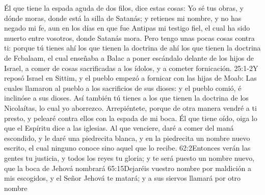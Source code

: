 Él que tiene la espada aguda de dos filos,%
 dice estas cosas:
Yo sé tus obras, y dónde moras,%
 donde está la silla de Satanás; y retienes mi nombre, y no has negado mi fe, aun en los días en que fue Antipas mi testigo fiel, el cual ha sido muerto entre vosotros, donde Satanás mora. %
Pero tengo unas pocas cosas contra ti: porque tú tienes ahí los que tienen la doctrina de ahí los que tienen la doctrina de Fcbalaam, el cual enseñaba a Balac a poner escándalo delante de los hijos de Israel, a comer de cosas sacrificadas a los ídolos, y a cometer fornicación.%
								{25:1-2}{Y reposó Israel en Sittim, y el pueblo empezó a fornicar con las hijas de Moab: Las cuales llamaron al pueblo a los sacrificios de sus dioses: y el pueblo comió, é inclinóse a sus dioses.}
Así también tú tienes a los que tienen la doctrina de los Nicolaítas, lo cual yo aborrezco. %
Arrepiéntete, porque de otra manera vendré a ti presto, y pelearé contra ellos con la espada de mi boca.%
Él que tiene oído, oiga lo que el Espíritu dice a las iglesias. Al que venciere, daré a comer del maná escondido,%
 y le daré una piedrecita blanca, y en la piedrecita un nombre nuevo escrito, el cual ninguno conoce sino aquel que lo recibe.
					{62:2}{Entonces verán las gentes tu justicia, y todos los reyes tu gloria; y te será puesto un nombre nuevo, que la boca de Jehová nombrará}
					{65:15}{Dejaréis vuestro nombre por maldición a mis escogidos, y el Señor Jehová te matará; y a sus siervos llamará por otro nombre}
